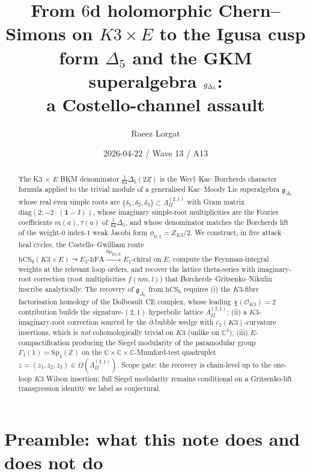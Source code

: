 \documentclass[11pt]{amsart}
\title{From $6$d holomorphic Chern--Simons on $K3\times E$ to
the Igusa cusp form $\Delta_{5}$ and the GKM superalgebra $\Gdelta$:\\
a Costello-channel assault}
\author{Raeez Lorgat}
\date{2026-04-22 / Wave 13 / A13}
\providecommand{\C}{\mathbb{C}}
\providecommand{\Z}{\mathbb{Z}}
\providecommand{\cO}{\mathcal{O}}
\providecommand{\dbar}{\bar{\partial}}
\providecommand{\hCS}{\mathrm{hCS}}
\providecommand{\HB}{\Lambda^{(2,1)}_{I\!I}}
\providecommand{\Gdelta}{\mathfrak{g}_{\Delta_{5}}}
\providecommand{\SpF}{\mathrm{Sp}}
\theoremstyle{plain}
\theoremstyle{definition}
\theoremstyle{remark}
\begin{document}
\maketitle

\begin{abstract}
The K3 $\times$ $E$ BKM denominator $\tfrac{1}{64}\Delta_{5}(2Z)$ is
the Weyl--Kac--Borcherds character formula applied to the trivial
module of a generalised Kac--Moody Lie superalgebra $\Gdelta$ whose
real even simple roots are $\{\delta_{1},\delta_{2},\delta_{3}\}\subset
\HB$ with Gram matrix $\mathrm{diag}(2;-2\cdot(\mathbf{1}-I))$, whose
imaginary simple-root multiplicities are the Fourier coefficients
$m(a), \tau(a)$ of $\tfrac{1}{64}\Delta_{5}$, and whose denominator
matches the Borcherds lift of the weight-$0$ index-$1$ weak Jacobi form
$\phi_{0,1} = Z_{K3}/2$. We construct, in five attack--heal cycles, the
Costello--Gwilliam route $\hCS_{6}(K3\times E)\leadsto E_{3}\text{-hFA}
\xrightarrow{\SpF_{K3,E}} E_{1}\text{-chiral on }E$, compute the
Feynman-integral weights at the relevant loop orders, and recover the
lattice theta-series with imaginary-root correction (root multiplicities
$f(nm,l)$) that Borcherds--Gritsenko--Nikulin inscribe analytically.
The recovery of $\Gdelta$ from $\hCS_{6}$ requires (i) the $K3$-fibre
factorisation homology of the Dolbeault CE complex, whose leading
$\chi(\cO_{K3})=2$ contribution builds the signature-$(2,1)$
hyperbolic lattice $\HB$; (ii) a $K3$-imaginary-root correction
sourced by the $\dbar$-bubble wedge with $\bar{c}_{2}(K3)$-curvature
insertions, which is \emph{not} cohomologically trivial on $K3$ (unlike
on $\C^{3}$); (iii) $E$-compactification producing the Siegel
modularity of the paramodular group $\Gamma_{1}(1)=\mathrm{Sp}_{4}(\Z)$
on the $\C\times\C\times\C$-Mumford-test quadruplet $z=(z_{1},z_{2},z_{3})
\in \Omega(\HB)$. Scope gate: the recovery is chain-level up to the
one-loop $K3$ Wilson insertion; full Siegel modularity remains
conditional on a Gritsenko-lift transgression identity we label as
conjectural.
\end{abstract}

\tableofcontents

\section{Preamble: what this note does and does not do}
\end{document}
